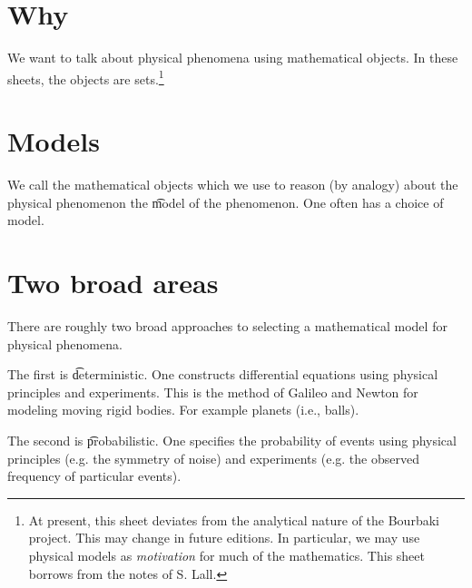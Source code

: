 
\section*{Why}

We want to talk about physical phenomena using mathematical objects.
In these sheets, the objects are sets.\footnote{At present, this sheet deviates from the analytical nature of the Bourbaki project. This may change in future editions. In particular, we may use physical models as \textit{motivation} for much of the mathematics. This sheet borrows from the notes of S. Lall.}

\section*{Models}

We call the mathematical objects which we use to reason (by analogy) about the physical phenomenon the \t{model} of the phenomenon.
One often has a choice of model.

\section*{Two broad areas}

There are roughly two broad approaches to selecting a mathematical model for physical phenomena.

The first is \t{deterministic}.
One constructs differential equations using physical principles and experiments.
This is the method of Galileo and Newton for modeling moving rigid bodies.
For example planets (i.e., balls).

The second is \t{probabilistic}.
One specifies the probability of events using physical principles (e.g. the symmetry of noise) and experiments (e.g. the observed frequency of particular events).

\blankpage